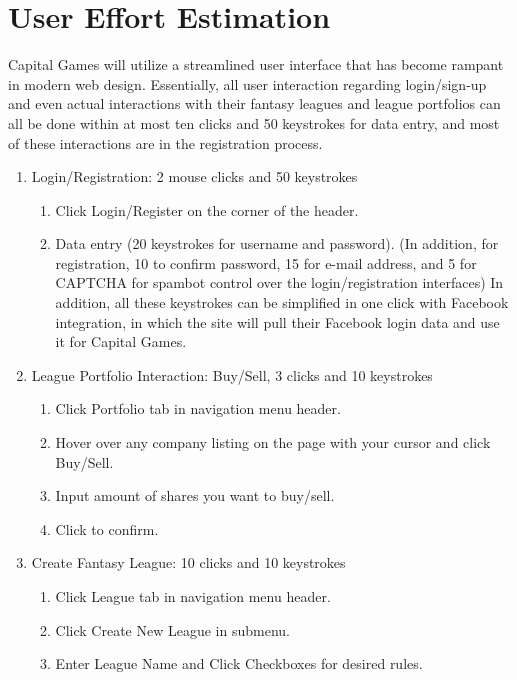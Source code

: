 \section{User Effort Estimation}

Capital Games will utilize a streamlined user interface that has become rampant in modern web design. Essentially, all user interaction regarding login/sign-up and even actual interactions with their fantasy leagues and league portfolios can all be done within at most ten clicks and 50 keystrokes for data entry, and most of these interactions are in the registration process.

\begin{enumerate}
\item Login/Registration: 2 mouse clicks and 50 keystrokes
\begin{enumerate}
\item Click Login/Register on the corner of the header.
\item Data entry (20 keystrokes for username and password). (In addition, for registration, 10 to confirm password, 15 for e-mail address, and 5 for CAPTCHA for spambot control over the login/registration interfaces)
In addition, all these keystrokes can be simplified in one click with Facebook integration, in which the site will pull their Facebook login data and use it for Capital Games.
\end{enumerate}
\item League Portfolio Interaction: Buy/Sell, 3 clicks and 10 keystrokes
\begin{enumerate}
\item Click Portfolio tab in navigation menu header.
\item Hover over any company listing on the page with your cursor and click Buy/Sell.
\item Input amount of shares you want to buy/sell. 
\item Click to confirm.
\end{enumerate}
\item Create Fantasy League: 10 clicks and 10 keystrokes
\begin{enumerate}
\item Click League tab in navigation menu header.
\item Click Create New League in submenu.
\item Enter League Name and Click Checkboxes for desired rules.

\end{enumerate}
\end{enumerate}
